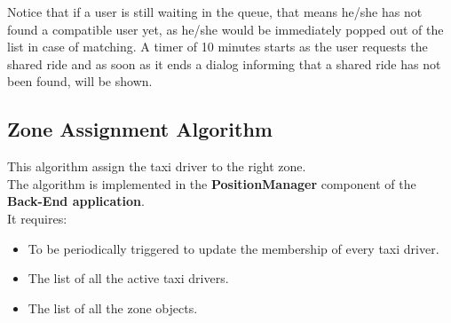 Notice that if a user is still waiting in the queue, that means he/she has not found a compatible user yet, as he/she would be immediately popped out of the list in case of matching.
A timer of 10 minutes starts as the user requests the shared ride and as soon as it ends a dialog informing that a shared ride has not been found, will be shown.





\subsection{Zone Assignment Algorithm} %
\label{sub:third_algorithm}
This algorithm assign the taxi driver to the right zone.\\
The algorithm is implemented in the \textbf{PositionManager} component of the \textbf{Back-End application}.\\
It requires:
\begin{itemize}
	\item To be periodically triggered to update the membership of every taxi driver.
	\item The list of all the active taxi drivers.
	\item The list of all the zone objects.
\end{itemize}







